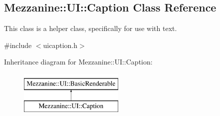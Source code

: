\hypertarget{classMezzanine_1_1UI_1_1Caption}{
\subsection{Mezzanine::UI::Caption Class Reference}
\label{classMezzanine_1_1UI_1_1Caption}
}


This class is a helper class, specifically for use with text.  




{\ttfamily \#include $<$uicaption.h$>$}

Inheritance diagram for Mezzanine::UI::Caption:\begin{figure}[H]
\begin{center}
\leavevmode
\includegraphics[height=2.000000cm]{classMezzanine_1_1UI_1_1Caption}
\end{center}
\end{figure}
